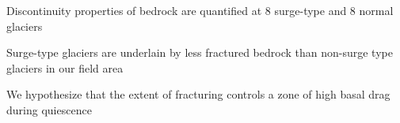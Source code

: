 \documentclass[draft,linenumbers]{agujournal}
\begin{document}





\begin{keypoints}
\item Discontinuity properties of bedrock are quantified at 8 surge-type and 8 normal glaciers
\item Surge-type glaciers are underlain by less fractured bedrock than non-surge type glaciers in our field area
\item We hypothesize that the extent of fracturing controls a zone of high basal drag during quiescence
\end{keypoints}

%
%

\end{document}

